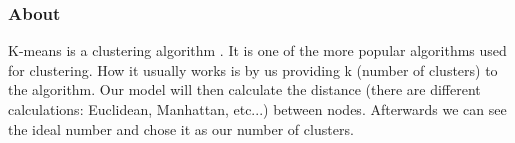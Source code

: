 \subsubsection{About}

K-means is a clustering algorithm \parencite{hartigan1979algorithm}. It is one of the more popular algorithms used for clustering. How it usually works is by us providing k (number of clusters) to the algorithm. Our model will then calculate the distance (there are different calculations: Euclidean, Manhattan, etc...) between nodes. Afterwards we can see the ideal number and chose it as our number of clusters.